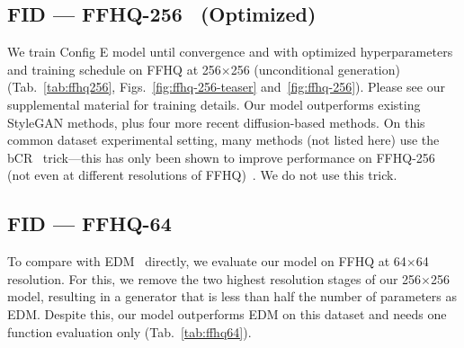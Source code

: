 \subsection{FID --- FFHQ-256\texorpdfstring{~\cite{sg1}}{} (Optimized)}
\vspace{-0.1cm}
We train Config E model until convergence and with optimized hyperparameters and training schedule on FFHQ at 256$\times$256 (unconditional generation) (Tab.~\ref{tab:ffhq256}, Figs.~\ref{fig:ffhq-256-teaser} and~\ref{fig:ffhq-256}). 
Please see our supplemental material for training details.
Our model outperforms existing StyleGAN methods, plus four more recent diffusion-based methods. On this common dataset experimental setting, many methods (not listed here) use the bCR~\cite{zhao2021improved} trick---this has only been shown to improve performance on FFHQ-256 (not even at different resolutions of FFHQ)~\cite{zhao2021improved, zhang2022styleswin}. We do not use this trick. 

\subsection{FID --- FFHQ-64\texorpdfstring{~\cite{edm}}{}}
\vspace{-0.1cm}
To compare with EDM~\cite{edm} directly, we evaluate our model on FFHQ at 64$\times$64 resolution. For this, we remove the two highest resolution stages of our 256$\times$256 model, resulting in a generator that is less than half the number of parameters as EDM. Despite this, our model outperforms EDM on this dataset and needs one function evaluation only (Tab.~\ref{tab:ffhq64}).

